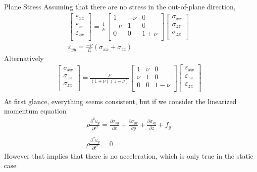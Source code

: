 \documentclass[a4paper, 11pt,article,oneside]{memoir}%
\begin{document}
\begin{eqbox2}{}{Plane Stress}
Assuming that there are no stress in the out-of-plane direction,
\begin{gather*}
\begin{bmatrix}
\varepsilon_{xx}\\
\varepsilon_{zz}\\
\varepsilon_{zx}\\
\end{bmatrix}=\frac{1}{E}
\begin{bmatrix}
1&-\nu&0\\
-\nu&1&0\\
0&0&1+\nu\\
\end{bmatrix}
\begin{bmatrix}
\sigma_{xx}\\
\sigma_{zz}\\
\sigma_{zx}\\
\end{bmatrix}\\
\varepsilon_{yy}=\frac{-\nu}{E}(\sigma_{xx}+\sigma_{zz})
\end{gather*}
Alternatively
\begin{gather*}
\begin{bmatrix}
\sigma_{xx}\\
\sigma_{zz}\\
\sigma_{zx}\\
\end{bmatrix}=\frac{E}{(1+\nu)(1-\nu)}
\begin{bmatrix}
1&\nu&0\\
\nu&1&0\\
0&0&1-\nu\\
\end{bmatrix}
\begin{bmatrix}
\varepsilon_{xx}\\
\varepsilon_{zz}\\
\varepsilon_{zx}\\
\end{bmatrix}\\
\end{gather*}
At first glance, everything seems consistent, but if we consider the linearized momentum equation 
\begin{gather*}
\rho \frac{\partial^2u_y}{\partial t^2}=\frac{\partial\sigma_{xy}}{\partial x}+\frac{\partial\sigma_{yy}}{\partial y}+\frac{\partial\sigma_{zy}}{\partial z}+f_y\\ \\
\rho \frac{\partial^2u_y}{\partial t^2}=0
\end{gather*}
However that implies that there is no acceleration, which is only true in the static case
\end{eqbox2}
\end{document}
